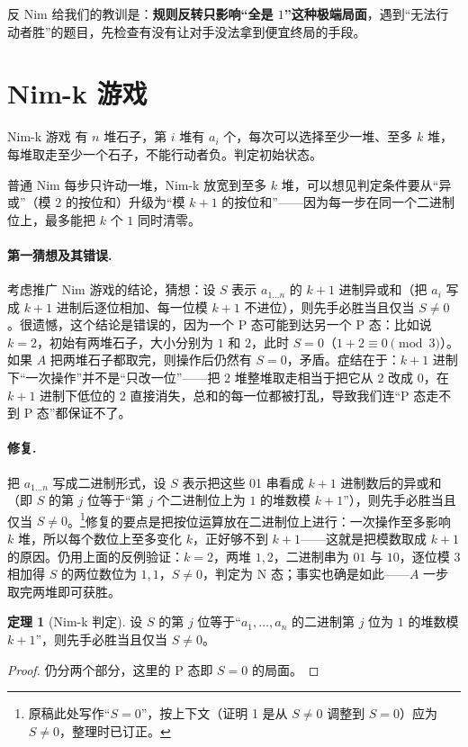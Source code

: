 \documentclass[UTF8,a4paper,11pt,oneside,openany,fontset=fandol]{ctexbook}
\theoremstyle{definition}
\newtheorem{theorem}[definition]{定理}
\begin{document}
反 Nim 给我们的教训是：\textbf{规则反转只影响“全是 $1$”这种极端局面}，遇到“无法行动者胜”的题目，先检查有没有让对手没法拿到便宜终局的手段。

\section{Nim-k 游戏}
\begin{problem}{Nim-k 游戏}
有 $n$ 堆石子，第 $i$ 堆有 $a_i$ 个，每次可以选择至少一堆、至多 $k$ 堆，每堆取走至少一个石子，不能行动者负。判定初始状态。
\end{problem}

普通 Nim 每步只许动一堆，Nim-k 放宽到至多 $k$ 堆，可以想见判定条件要从“异或”（模 $2$ 的按位和）升级为“模 $k+1$ 的按位和”——因为每一步在同一个二进制位上，最多能把 $k$ 个 $1$ 同时清零。

\paragraph{第一猜想及其错误.} 考虑推广 Nim 游戏的结论，猜想：设 $S$ 表示 $a_{1\ldots n}$ 的 $k+1$ 进制异或和（把 $a_i$ 写成 $k+1$ 进制后逐位相加、每一位模 $k+1$ 不进位），则先手必胜当且仅当 $S\ne0$。很遗憾，这个结论是错误的，因为一个 P 态可能到达另一个 P 态：比如说 $k=2$，初始有两堆石子，大小分别为 $1$ 和 $2$，此时 $S=0$（$1+2\equiv0\pmod 3$）。如果 $A$ 把两堆石子都取完，则操作后仍然有 $S=0$，矛盾。症结在于：$k+1$ 进制下“一次操作”并不是“只改一位”——把 $2$ 堆整堆取走相当于把它从 $2$ 改成 $0$，在 $k+1$ 进制下低位的 $2$ 直接消失，总和的每一位都被打乱，导致我们连“P 态走不到 P 态”都保证不了。

\paragraph{修复.} 把 $a_{1\ldots n}$ 写成二进制形式，设 $S$ 表示把这些 01 串看成 $k+1$ 进制数后的异或和（即 $S$ 的第 $j$ 位等于“第 $j$ 个二进制位上为 $1$ 的堆数模 $k+1$”），则先手必胜当且仅当 $S\ne0$。\footnote{原稿此处写作“$S=0$”，按上下文（证明 1 是从 $S\ne0$ 调整到 $S=0$）应为 $S\ne0$，整理时已订正。}修复的要点是把按位运算放在二进制位上进行：一次操作至多影响 $k$ 堆，所以每个数位上至多变化 $k$，正好够不到 $k+1$——这就是把模数取成 $k+1$ 的原因。仍用上面的反例验证：$k=2$，两堆 $1,2$，二进制串为 $01$ 与 $10$，逐位模 $3$ 相加得 $S$ 的两位数位为 $1,1$，$S\ne0$，判定为 N 态；事实也确是如此——$A$ 一步取完两堆即可获胜。

\begin{theorem}[Nim-k 判定]\label{thm:nimk}
设 $S$ 的第 $j$ 位等于“$a_1,\ldots,a_n$ 的二进制第 $j$ 位为 $1$ 的堆数模 $k+1$”，则先手必胜当且仅当 $S\ne0$。
\end{theorem}
\begin{proof}
仍分两个部分，这里的 P 态即 $S=0$ 的局面。
\end{proof}
\end{document}
